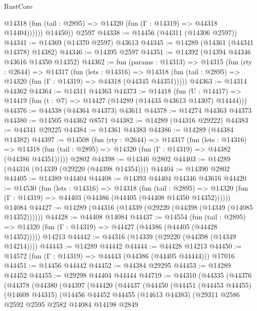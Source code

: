 \begin{lexlean}{RustCore}
\begin{coremodule}
              @14318 (fun (tail : @2895) => @14320 (fun (Γ : @14319) => @44318 @14404))))))
        @14450))
    @2597
@44338 := @14456 (@44311 (@14306 @2597))
@44341 := @14369 (@14370 @2597) @43613
@44345 := @14289 (@14361 (@44341 @14378) @14382)
@44346 := @14395 @2597
@44351 := @14392 (@14394 @44346 @43616 @14350 @14352)
@44362 := fun (params : @14313) =>
  @14315
    (fun (rty : @2644) =>
    @14317
      (fun (lets : @14316) =>
      @14318 (fun (tail : @2895) => @14320 (fun (Γ : @14319) => @44318 (@44345 @44351)))))
@44363 := @14314 @44362
@44364 := @14311 @44363
@44373 := @14418
    (fun (U : @14417) => @14419 (fun (t : @7) => @14427 (@14289 (@14433 @43613 @14307) @14444)))
@44376 := @44338 (@44364 @44373) @43611
@44378 := @14274 @44363 @44373
@44380 := @14505 @44362 @8571
@44382 := @14289 (@44316 @29222)
@44383 := @44341 @29225
@44384 := @14361 @44383
@44386 := @14289 (@44384 @14382)
@44397 := @14508
    (fun (rty : @2644) =>
    @14317
      (fun (lets : @14316) =>
      @14318 (fun (tail : @2895) => @14320 (fun (Γ : @14319) => @44382 (@44386 @44351)))))
    @2802
@44398 := @14346 @2802
@44403 := @14289 (@44316 (@14339 (@29220 (@44398 @14354))))
@44404 := @14390 @2802
@44405 := @14389 @44404
@44408 := @14393 @44404 @44346 @43616
@44420 := @14530
    (fun (lets : @14316) =>
    @14318
      (fun (tail : @2895) =>
      @14320 (fun (Γ : @14319) => @44403 (@44386 (@44405 (@44408 @14350 @14352))))))
    @14084
@44427 := @14289 (@44316 (@14339 (@29220 (@44398 (@14349 (@14085 @14352))))))
@44428 := @44408 @14084
@44437 := @14554
    (fun (tail : @2895) => @14320 (fun (Γ : @14319) => @44427 (@44386 (@44405 (@44428 @14352)))))
    @14213
@44442 := @44316 (@14339 (@29220 (@44398 (@14349 @14214))))
@44443 := @14289 @44442
@44444 := @44428 @14213
@44450 := @14572 (fun (Γ : @14319) => @44443 (@44386 (@44405 @44444))) @17016
@44451 := @14456 @44442
@44452 := @44384 @29295
@44453 := @14289 @44452
@44455 := @29298 @44404 @44444
@44719 := @44310
    (@44335
      (@44376
        (@44378
          (@44380
            (@44397
              (@44420
                (@44437
                  (@44450
                    (@44451
                      (@44453 @44455)
                      (@14608 @44315)
                      (@14456
                        @44452
                        @44455
                        (@14613 @44383)
                        (@29311
                          @2586
                          @2592
                          @2595
                          @2582
                          @14084
                          @14198
                          @2849

\end{coremodule}
\end{lexlean}
